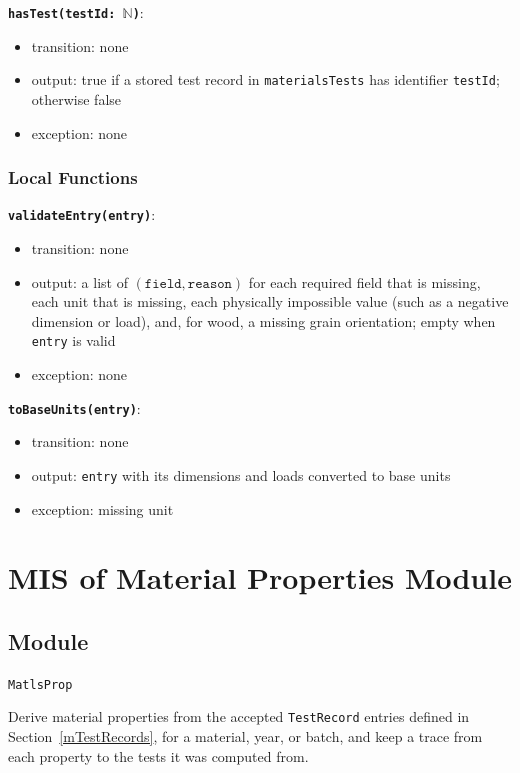\documentclass[12pt, titlepage]{article}
\begin{document}
\textbf{\texttt{hasTest(testId: $\mathbb{N}$)}}:
\begin{itemize}
  \item transition: none
  \item output: true if a stored test record in \texttt{materialsTests} has identifier \texttt{testId}; otherwise false
  \item exception: none
\end{itemize}

\subsubsection{Local Functions}

\textbf{\texttt{validateEntry(entry)}}:
\begin{itemize}
  \item transition: none
  \item output: a list of $(\texttt{field}, \texttt{reason})$ for each required field that is missing, each unit that is missing, each physically impossible value (such as a negative dimension or load), and, for wood, a missing grain orientation; empty when \texttt{entry} is valid
  \item exception: none
\end{itemize}

\textbf{\texttt{toBaseUnits(entry)}}:
\begin{itemize}
  \item transition: none
  \item output: \texttt{entry} with its dimensions and loads converted to base units
  \item exception: missing unit
\end{itemize}

\newpage

\section{MIS of Material Properties Module} \label{mMatProps}

\subsection{Module}
\texttt{MatlsProp}

Derive material properties from the accepted \texttt{TestRecord} entries defined in Section~\ref{mTestRecords}, for a material, year, or batch, and keep a trace from each property to the tests it was computed from.
\end{document}
